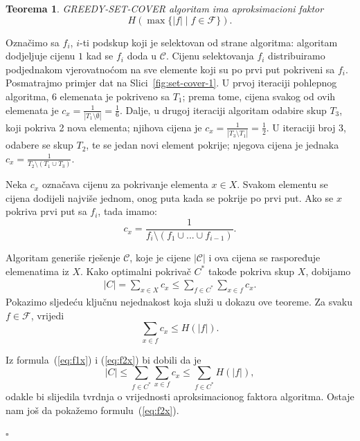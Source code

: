 \documentclass[a4paper, utf8, 11pt, colorlinks]{book}
\newtheorem{thm}{Teorema}
\newenvironment{proof}{{Dokaz:}}{\hfill$\square$}
\begin{document}
\begin{thm}
	  GREEDY-SET-COVER algoritam ima aproksimacioni faktor 
	$$ H(\max\{|f| \mid f \in \mathcal{F}\}).$$
	
\end{thm}
\begin{proof}
	  Označimo sa $f_i$, $i$-ti podskup koji je selektovan od strane algoritma: algoritam dodjeljuje cijenu $1$ kad se $f_i$ doda u $\mathcal{C}$. 
	  Cijenu selektovanja $f_i$ distribuiramo podjednakom vjerovatnoćom na sve elemente koji su po prvi put pokriveni sa $f_i$. Posmatrajmo primjer dat na Slici~\ref{fig:set-cover-1}. U prvoj iteraciji pohlepnog algoritma,  
	  6 elemenata je pokriveno sa $T_1$; prema tome, cijena svakog od ovih elemenata je $c_x = \frac{1}{|T_1\setminus \emptyset|}= \frac{1}{6}$. Dalje, u drugoj iteraciji algoritam odabire skup $T_3$, koji pokriva 2 nova elementa; njihova cijena je $c_x=\frac{1}{|T_3 \setminus T_1|} = \frac{1}{2}$. U iteraciji broj 3, odabere se skup $T_2$, te se jedan novi element pokrije; njegova cijena je jednaka $c_x = \frac{1}{T_2 \setminus ( T_1 \cup T_3)}$. 
	 
	 Neka $ c_x$ označava cijenu za pokrivanje elementa $x\in X$.  Svakom elementu se cijena dodijeli najviše jednom, onog puta kada se pokrije po prvi put. Ako se $x$ pokriva prvi put sa $f_i$, tada imamo:
	 $$c_x = \frac{1}{f_i \setminus (f_1 \cup ...\cup f_{i-1})}.$$
	 
	 Algoritam generiše rješenje $\mathcal{C}$, koje je cijene $|\mathcal{C}|$ i ova cijena se raspoređuje elemenatima iz $X$. Kako optimalni pokrivač $C^*$ takođe pokriva skup $X$, dobijamo
	 \begin{align}\label{eq:f1x}
	 	|C| = \sum_{x \in X} c_x \leq \sum_{f \in C^*}\sum_{x \in f} c_x.
	 \end{align}
	  Pokazimo sljedeću ključnu nejednakost koja služi u dokazu ove teoreme. Za svaku $f \in \mathcal{F}$, vrijedi  
	 \begin{equation}\label{eq:f2x}
	 	\sum_{x \in f} c_x \leq H(|f|).
	 \end{equation}
	 
	 Iz formula~(\ref{eq:f1x}) i (\ref{eq:f2x}) bi dobili da je 
	 \begin{equation}
	 	|C| \leq \sum_{f \in C^*}\sum_{x \in f} c_x \leq \sum_{f \in C^*} H(|f|),
	 \end{equation}
	 odakle bi slijedila tvrdnja o vrijednosti aproksimacionog faktora algoritma.
	 Ostaje nam još da pokažemo formulu~(\ref{eq:f2x}). 
	 

\end{proof}
\end{document}
